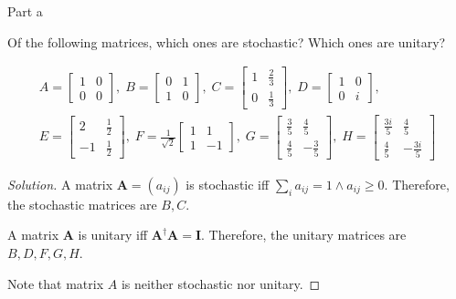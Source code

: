\begin{solution}{Part a}\label{ques:1a}
  \begin{question}
    Of the following matrices, which ones are stochastic? Which
    ones are unitary?

    \begin{gather*}
    A =
    \begin{bmatrix}
    1 & 0\\
    0 & 0
    \end{bmatrix}\!,\;
    B=
    \begin{bmatrix}
    0 & 1\\
    1 & 0
    \end{bmatrix}\!,\;
    C=
    \begin{bmatrix}
    1 & \frac{2}{3}\\[0.1em]
    0 & \frac{1}{3}
    \end{bmatrix}\!,\;
    D=
    \begin{bmatrix}
    1 & 0\\
    0 & i
    \end{bmatrix}\!,\\
    E =
    \begin{bmatrix}
    2 & \frac{1}{2}\\[0.1em]
    -1 & \frac{1}{2}
    \end{bmatrix}\!,\;
    F = \frac{1}{\sqrt{2}}
    \begin{bmatrix}
    1 & 1\\
    1 & -1
    \end{bmatrix}\!,\;
    G=
    \begin{bmatrix}
    \frac{3}{5} & \frac{4}{5}\\[0.1em]
    \frac{4}{5} & -\frac{3}{5}
    \end{bmatrix}\!,\;
    H=
    \begin{bmatrix}
    \frac{3i}{5} & \frac{4}{5}\\[0.1em]
    \frac{4}{5} & -\frac{3i}{5}
    \end{bmatrix}
    \end{gather*}
  \end{question}
  \tcblower{}
  \begin{proof}[Solution]
    A matrix $\mathbf{A} = (a_{ij})$ is stochastic iff $\sum_{i} a_{ij} = 1 \wedge a_{ij} \geq 0$. Therefore, the stochastic matrices are $B, C$.\par
    A matrix $\mathbf{A}$ is unitary iff $\mathbf{A}^\dag\mathbf{A} = \mathbf{I}$. Therefore, the unitary matrices are $B, D, F, G, H$.\par
    Note that matrix $A$ is neither stochastic nor unitary.
  \end{proof}
\end{solution}


